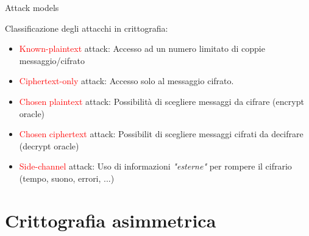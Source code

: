 \documentclass[handout, xcolor=dvipsnames,aspectratio=169]{beamer}
\begin{document}
\begin{frame}{Attack models}

\medskip

Classificazione degli attacchi in crittografia:

\medskip

\small

\begin{itemize}
  \item \textcolor{red}{Known-plaintext} attack: Accesso ad un numero limitato di coppie messaggio/cifrato
  \medskip
  \item \textcolor{red}{Ciphertext-only} attack: Accesso solo al messaggio cifrato.
  \medskip
  \item \textcolor{red}{Chosen plaintext} attack: Possibilità di scegliere messaggi da cifrare (encrypt oracle)
  \medskip
  \item \textcolor{red}{Chosen ciphertext} attack: Possibilit di scegliere messaggi cifrati da decifrare (decrypt oracle) 
  \medskip
  \item \textcolor{red}{Side-channel} attack: Uso di informazioni \textit{"esterne"} per rompere il cifrario (tempo, suono, errori, ...)
\end{itemize}
  
\end{frame}


\part{Crittografia asimmetrica}

\begin{frame}
	\partpage
	\centering
\end{frame}
\end{document}
